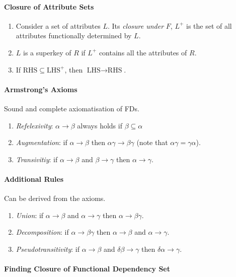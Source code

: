\documentclass[twocolumn,english]{article}
\begin{document}
\paragraph{Closure of Attribute Sets}
\begin{enumerate}
\item Consider a set of attributes $L$. Its \emph{closure under} $F$,
$L^{+}$ is the set of all attributes functionally determined by $L$.
\item $L$ is a superkey of $R$ if $L^{+}$ contains all the attributes
of $R$.
\item If $\mbox{RHS}\subseteq\mbox{LHS}^{+}$, then $\mbox{LHS}\rightarrow\mbox{RHS}$.
\end{enumerate}

\paragraph{Armstrong's Axioms}

Sound and complete axiomatisation of FDs.
\begin{enumerate}
\item \emph{Refelexivity}: $\alpha\rightarrow\beta$ always holds if $\beta\subseteq\alpha$
\item \emph{Augmentation}: if $\alpha\rightarrow\beta$ then $\alpha\gamma\rightarrow\beta\gamma$
(note that $\alpha\gamma=\gamma\alpha$).
\item \emph{Transivitiy}: if $\alpha\rightarrow\beta$ and $\beta\rightarrow\gamma$
then $\alpha\rightarrow\gamma$.
\end{enumerate}

\paragraph{Additional Rules}

Can be derived from the axioms.
\begin{enumerate}
\item \emph{Union}: if $\alpha\rightarrow\beta$ and $\alpha\rightarrow\gamma$
then $\alpha\rightarrow\beta\gamma$.
\item \emph{Decomposition}: if $\alpha\rightarrow\beta\gamma$ then $\alpha\rightarrow\beta$
and $\alpha\rightarrow\gamma$.
\item \emph{Pseudotransitivity}: if $\alpha\rightarrow\beta$ and $\delta\beta\rightarrow\gamma$
then $\delta\alpha\rightarrow\gamma$.
\end{enumerate}

\paragraph{Finding Closure of Functional Dependency Set}
\end{document}
